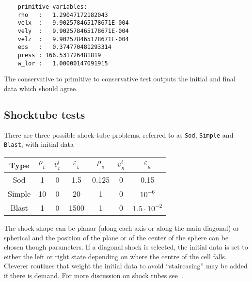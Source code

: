 \documentclass{article}
\begin{document}
\begin{verbatim}
    primitive variables: 
    rho   :   1.29047172182043     
    velx  :   9.902578465178671E-004
    vely  :   9.902578465178671E-004
    velz  :   9.902578465178671E-004
    eps   :   0.374770481293314     
    press : 166.531726481819     
    w_lor :   1.00000147091915  
\end{verbatim}
The conservative to primitive to conservative test outputs the initial
and final data which should agree.

\subsection{Shocktube tests}
\label{sec:shock}

There are three possible shock-tube problems, referred to as {\tt Sod},
{\tt Simple} and {\tt Blast}, with initial data
\begin{center}
  \begin{tabular}[c]{|c|c|c|c|c|c|c|}
    \hline Type & $\rho_{_L}$ & $v^i_{_L}$ & $\varepsilon_{_L}$ & $\rho_{_R}$ & $v^i_{_R}$
    & $\varepsilon_{_R}$ \\ \hline
    Sod & 1 & 0 & 1.5 & 0.125 & 0 & 0.15 \\
    Simple & 10 & 0 & 20 & 1 & 0 & $10^{-6}$ \\
    Blast & 1 & 0 & 1500 & 1 & 0 & $1.5\cdot 10^{-2}$ \\ \hline
  \end{tabular}
\end{center}
The shock shape can be planar (along each axis or along the main diagonal) or spherical and the
position of the plane or of the center of the sphere can be chosen though parameters.
If a diagonal shock is selected, the initial data is set to either the left or right
state depending on where the centre of the cell falls. Cleverer
routines that weight the initial data to avoid ``staircasing'' may be
added if there is demand. For more discussion on shock tubes
see~\cite{livrevsrrfd}. 
\end{document}
